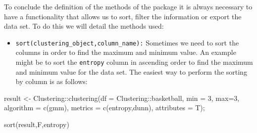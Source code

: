 \documentclass[
]{article}
\newenvironment{Shaded}{\begin{snugshade}}{\end{snugshade}}
\newcommand{\AttributeTok}[1]{\textcolor[rgb]{0.77,0.63,0.00}{#1}}
\newcommand{\DecValTok}[1]{\textcolor[rgb]{0.00,0.00,0.81}{#1}}
\newcommand{\FunctionTok}[1]{\textcolor[rgb]{0.00,0.00,0.00}{#1}}
\newcommand{\NormalTok}[1]{#1}
\newcommand{\OtherTok}[1]{\textcolor[rgb]{0.56,0.35,0.01}{#1}}
\newcommand{\SpecialCharTok}[1]{\textcolor[rgb]{0.00,0.00,0.00}{#1}}
\newcommand{\StringTok}[1]{\textcolor[rgb]{0.31,0.60,0.02}{#1}}
\providecommand{\tightlist}{%
  \setlength{\itemsep}{0pt}\setlength{\parskip}{0pt}}
\begin{document}
To conclude the definition of the methods of the package it is always
necessary to have a functionality that allows us to sort, filter the
information or export the data set. To do this we will detail the
methods used:

\begin{itemize}
\tightlist
\item
  \texttt{sort(clustering\_object,column\_name):} Sometimes we need to
  sort the columns in order to find the maximum and minimum value. An
  example might be to sort the \texttt{entropy} column in ascending
  order to find the maximum and minimum value for the data set. The
  easiest way to perform the sorting by column is as follows:
\end{itemize}

\begin{Shaded}
\begin{Highlighting}[]
\NormalTok{result }\OtherTok{\textless{}{-}}\NormalTok{ Clustering}\SpecialCharTok{::}\FunctionTok{clustering}\NormalTok{(}\AttributeTok{df =}\NormalTok{ Clustering}\SpecialCharTok{::}\NormalTok{basketball, }\AttributeTok{min =} \DecValTok{3}\NormalTok{, }\AttributeTok{max=}\DecValTok{3}\NormalTok{, }
          \AttributeTok{algorithm =} \FunctionTok{c}\NormalTok{(}\StringTok{\textquotesingle{}gmm\textquotesingle{}}\NormalTok{), }\AttributeTok{metrics =} \FunctionTok{c}\NormalTok{(}\StringTok{\textquotesingle{}entropy\textquotesingle{}}\NormalTok{,}\StringTok{\textquotesingle{}dunn\textquotesingle{}}\NormalTok{), }\AttributeTok{attributes =}\NormalTok{ T);}

\FunctionTok{sort}\NormalTok{(result,F,}\StringTok{\textquotesingle{}entropy\textquotesingle{}}\NormalTok{)}
\end{Highlighting}
\end{Shaded}
\end{document}
